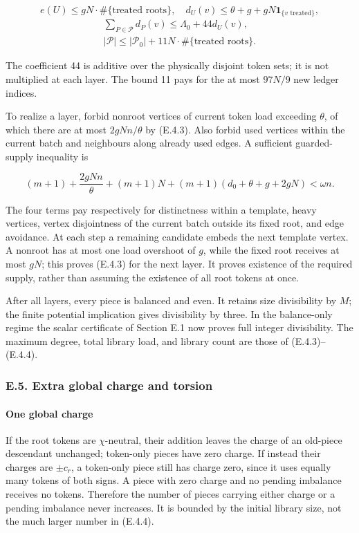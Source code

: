 \documentclass[english,11pt,a4paper]{article}
\begin{document}
\[e(U)\le gN\cdot\#\{\text{treated roots}\},\quad
d_U(v)\le\theta+g+gN\mathbf1_{\{v\text{ treated}\}},
\tag{E.4.3}\] \[\begin{gathered}
\sum_{P\in\mathcal P}d_P(v)\le\Lambda_0+44d_U(v),\\
|\mathcal P|\le|\mathcal P_0|+11N\cdot\#\{\text{treated roots}\}.
\end{gathered}
\tag{E.4.4}\]

The coefficient 44 is additive over the physically disjoint token sets; it is not multiplied at each layer. The bound 11 pays for the at most \(97N/9\) new ledger indices.

To realize a layer, forbid nonroot vertices of current token load exceeding \(\theta\), of which there are at most \(2gNn/\theta\) by (E.4.3). Also forbid used vertices within the current batch and neighbours along already used edges. A sufficient guarded-supply inequality is

\[(m+1)+\frac{2gNn}{\theta}+(m+1)N
+(m+1)(d_0+\theta+g+2gN)<\omega n.
\tag{E.4.5}\]

The four terms pay respectively for distinctness within a template, heavy vertices, vertex disjointness of the current batch outside its fixed root, and edge avoidance. At each step a remaining candidate embeds the next template vertex. A nonroot has at most one load overshoot of \(g\), while the fixed root receives at most \(gN\); this proves (E.4.3) for the next layer. It proves existence of the required supply, rather than assuming the existence of all root tokens at once.

After all layers, every piece is balanced and even. It retains size divisibility by \(M\); the finite potential implication gives divisibility by three. In the balance-only regime the scalar certificate of Section E.1 now proves full integer divisibility. The maximum degree, total library load, and library count are those of (E.4.3)--(E.4.4).

\subsubsection{E.5. Extra global charge and torsion}\label{e.5.-extra-global-charge-and-torsion}

\paragraph{One global charge}\label{one-global-charge}

If the root tokens are \(\chi\)-neutral, their addition leaves the charge of an old-piece descendant unchanged; token-only pieces have zero charge. If instead their charges are \(\pm c_r\), a token-only piece still has charge zero, since it uses equally many tokens of both signs. A piece with zero charge and no pending imbalance receives no tokens. Therefore the number of pieces carrying either charge or a pending imbalance never increases. It is bounded by the initial library size, not the much larger number in (E.4.4).
\end{document}
